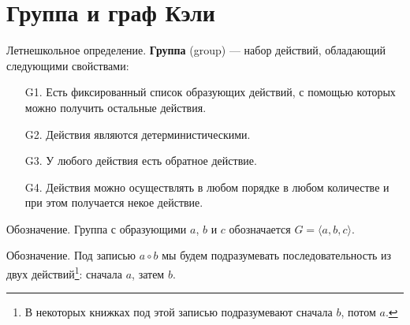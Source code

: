 \documentclass[12pt]{article} %
\begin{document}

\newpage
\section{Группа и граф Кэли}

Летнешкольное определение. \textbf{Группа} (group) — набор действий, обладающий следующими свойствами:
\begin{enumerate}
  \item[G1.] Есть фиксированный список образующих действий, с помощью которых можно получить остальные действия.
  \item[G2.] Действия являются детерминистическими.
  \item[G3.] У любого действия есть обратное действие.
  \item[G4.] Действия можно осуществлять в любом порядке в любом количестве и при этом получается некое действие.
\end{enumerate}

Обозначение. Группа с образующими $a$, $b$ и $c$ обозначается $G = \langle a, b, c \rangle$.

Обозначение. Под записью $a \circ b$ мы будем подразумевать последовательность из двух действий\footnote{В некоторых книжках под этой записью подразумевают сначала $b$, потом $a$.}: сначала $a$, затем $b$.
\end{document}
